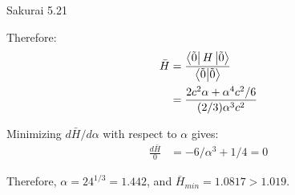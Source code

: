 \documentclass{article}
\begin{document}
\begin{section}{Sakurai 5.21}
\begin{tcolorbox}[breakable]
			Therefore: 
			\begin{align*}
				\bar{H} &= \frac{\bra{\tilde{0}}H\ket{\tilde{0}}}{\bra{\tilde{0}}\ket{\tilde{0}}} \\
				&= \frac{2c^2\alpha + \alpha^4 c^2/6}{(2/3) \alpha^3 c^2} \\
			\end{align*}

			Minimizing $d\bar{H}/d\alpha$ with respect to $\alpha$ gives:
			\begin{align*}
				\frac{d\bar{H}}{0} &= -6/\alpha^3 + 1/4 = 0
			\end{align*}

			Therefore, $\alpha = 24^{1/3} = 1.442$, and $\bar{H}_{min} = 1.0817 > 1.019$.
		\end{tcolorbox}
	\end{section}
	
\end{document}
